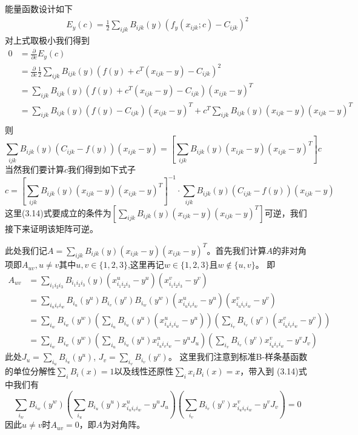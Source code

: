 能量函数设计如下
\begin{equation}
    \begin{split}
        E_y(c) = \frac{1}{2} \sum_{ijk} B_{ijk}(y)(f_y(x_{ijk};c) - C_{ijk})^2
    \end{split}
\end{equation}
对上式取极小我们得到
\begin{equation}
    \begin{split}
        0& = \frac{\partial}{\partial c} E_y(c)\\
        &= \frac{\partial}{\partial c} \frac{1}{2}\sum_{ijk} B_{ijk}(y)(f(y) + c^T (x_{ijk} - y) - C_{ijk})^2\\
        &= \sum_{ijk} B_{ijk}(y)(f(y) + c^T (x_{ijk} - y) - C_{ijk}) (x_{ijk} - y)^T\\
        &= \sum_{ijk} B_{ijk}(y)(f(y) - C_{ijk})(x_{ijk} - y)^T + c^T\sum_{ijk}B_{ijk}(y)(x_{ijk} - y)(x_{ijk} - y)^T\\ 
    \end{split}
\end{equation}
则 $$\sum_{ijk} B_{ijk}(y) (C_{ijk} - f(y)) (x_{ijk} - y) = [\sum_{ijk}B_{ijk}(y)(x_{ijk} - y)(x_{ijk} - y)^T]c $$
当然我们要计算$c$我们得到如下式子
\begin{equation}
    c = [\sum_{ijk}B_{ijk}(y)(x_{ijk} - y)(x_{ijk} - y)^T]^{-1} \cdot \sum_{ijk} B_{ijk}(y) (C_{ijk} - f(y)) (x_{ijk} - y)
\end{equation}
这里(3.14)式要成立的条件为$[\sum_{ijk}B_{ijk}(y)(x_{ijk} - y)(x_{ijk} - y)^T]$可逆，我们接下来证明该矩阵可逆。

此处我们记$A = \sum_{ijk}B_{ijk}(y)(x_{ijk} - y)(x_{ijk} - y)^T$。首先我们计算$A$的非对角项即$A_{uv}, u\neq v\text{其中} u,v \in \{1,2,3\}$,这里再记$w \in \{1,2,3\}\text{且} w \notin \{u,v\} $。
即
{
\begin{equation}
    \begin{split}
        A_{uv} &= \sum_{i_1 i_2 i_3} B_{i_1 i_2 i_3}(y) (x_{i_1 i_2 i_3}^u - y^u)(x_{i_1 i_2 i_3}^v - y^v)\\
        & = \sum_{i_u i_v i_w} B_{i_u}(y^u)B_{i_v}(y^v)B_{i_w}(y^w) (x_{i_u i_v i_w}^u - y^u)(x_{i_u i_v i_w}^v - y^v)\\
        & = \sum_{i_w}B_{i_w}(y^w)(\sum_{i_u}B_{i_u}(y^u)(x_{i_u i_v i_w}^u - y^u))(\sum_{i_v}B_{i_v}(y^v)(x_{i_u i_v i_w}^v - y^v))\\
        & =  \sum_{i_w}B_{i_w}(y^w)(\sum_{i_u}B_{i_u}(y^u)x_{i_u i_v i_w}^u - y^uJ_u)(\sum_{i_v}B_{i_v}(y^v)x_{i_u i_v i_w}^v - y^vJ_v)
    \end{split}
\end{equation}
}
此处$J_u = \sum_{i_u}B_{i_u}(y^u)$, $J_v = \sum_{i_v}B_{i_v}(y^v)$。
这里我们注意到标准B-样条基函数的单位分解性$\sum_i B_i(x) = 1$以及线性还原性$\sum_i x_iB_i(x) = x$，带入到
(3.14)式中我们有
$$\sum_{i_w}B_{i_w}(y^w)(\sum_{i_u}B_{i_u}(y^u)x_{i_u i_v i_w}^u - y^uJ_u)(\sum_{i_v}B_{i_v}(y^v)x_{i_u i_v i_w}^v - y^vJ_v) = 0$$
因此$u\neq v\text{时}A_{uv} = 0$，即$A$为对角阵。


